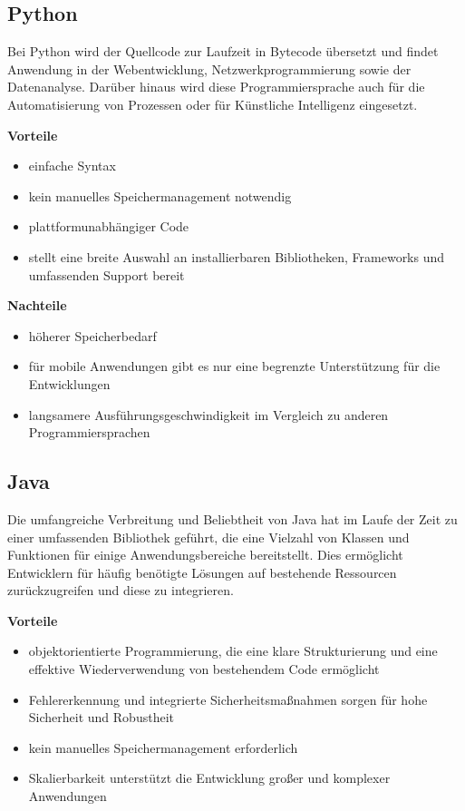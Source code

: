 \newpage
\subsection{Python}
Bei Python wird der Quellcode zur Laufzeit in Bytecode übersetzt und findet Anwendung in der Webentwicklung, Netzwerkprogrammierung sowie der Datenanalyse. Darüber hinaus wird diese Programmiersprache auch für die Automatisierung von Prozessen oder für Künstliche Intelligenz eingesetzt. \parencite{Programmiersprachen}


\textbf{Vorteile}
\begin{itemize}
	\item einfache Syntax
	\item kein manuelles Speichermanagement notwendig
	\item plattformunabhängiger Code
	\item stellt eine breite Auswahl an installierbaren Bibliotheken, Frameworks und umfassenden Support bereit
\end{itemize}

\textbf{Nachteile}
\begin{itemize}
	\item höherer Speicherbedarf
	\item für mobile Anwendungen gibt es nur eine begrenzte Unterstützung für die Entwicklungen
	\item langsamere Ausführungsgeschwindigkeit im Vergleich zu anderen Programmiersprachen
\end{itemize}

\subsection{Java}
Die umfangreiche Verbreitung und Beliebtheit von Java hat im Laufe der Zeit zu einer umfassenden Bibliothek geführt, die eine Vielzahl von Klassen und Funktionen für einige Anwendungsbereiche bereitstellt. Dies ermöglicht Entwicklern für häufig benötigte Lösungen auf bestehende Ressourcen zurückzugreifen und diese zu integrieren. \parencite{Programmiersprachen}

\textbf{Vorteile}
\begin{itemize}
	\item objektorientierte Programmierung, die eine klare Strukturierung und eine effektive Wiederverwendung von bestehendem Code ermöglicht
	\item Fehlererkennung und integrierte Sicherheitsmaßnahmen sorgen für hohe Sicherheit und Robustheit
	\item kein manuelles Speichermanagement erforderlich
	\item Skalierbarkeit unterstützt die Entwicklung großer und komplexer Anwendungen
\end{itemize}

